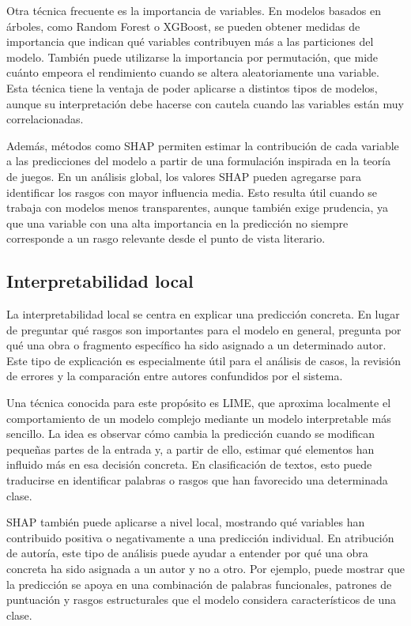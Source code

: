 \documentclass[IB]{TFUOC}%
\begin{document}
Otra técnica frecuente es la importancia de variables. En modelos basados en árboles, como Random Forest o XGBoost, se pueden obtener medidas de importancia que indican qué variables contribuyen más a las particiones del modelo. También puede utilizarse la importancia por permutación, que mide cuánto empeora el rendimiento cuando se altera aleatoriamente una variable. Esta técnica tiene la ventaja de poder aplicarse a distintos tipos de modelos, aunque su interpretación debe hacerse con cautela cuando las variables están muy correlacionadas.

Además, métodos como SHAP permiten estimar la contribución de cada variable a las predicciones del modelo a partir de una formulación inspirada en la teoría de juegos\cite{lundberg2017unified}. En un análisis global, los valores SHAP pueden agregarse para identificar los rasgos con mayor influencia media. Esto resulta útil cuando se trabaja con modelos menos transparentes, aunque también exige prudencia, ya que una variable con una alta importancia en la predicción no siempre corresponde a un rasgo relevante desde el punto de vista literario.

\subsection{Interpretabilidad local}

La interpretabilidad local se centra en explicar una predicción concreta. En lugar de preguntar qué rasgos son importantes para el modelo en general, pregunta por qué una obra o fragmento específico ha sido asignado a un determinado autor. Este tipo de explicación es especialmente útil para el análisis de casos, la revisión de errores y la comparación entre autores confundidos por el sistema.

Una técnica conocida para este propósito es LIME, que aproxima localmente el comportamiento de un modelo complejo mediante un modelo interpretable más sencillo\cite{ribeiro2016should}. La idea es observar cómo cambia la predicción cuando se modifican pequeñas partes de la entrada y, a partir de ello, estimar qué elementos han influido más en esa decisión concreta. En clasificación de textos, esto puede traducirse en identificar palabras o rasgos que han favorecido una determinada clase.

SHAP también puede aplicarse a nivel local, mostrando qué variables han contribuido positiva o negativamente a una predicción individual. En atribución de autoría, este tipo de análisis puede ayudar a entender por qué una obra concreta ha sido asignada a un autor y no a otro. Por ejemplo, puede mostrar que la predicción se apoya en una combinación de palabras funcionales, patrones de puntuación y rasgos estructurales que el modelo considera característicos de una clase.
\end{document}
